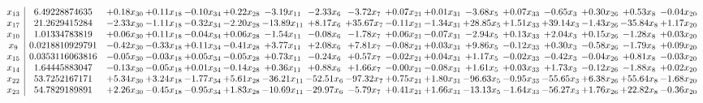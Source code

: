 \documentclass[9pt]{article}
\begin{document}
 \[\begin{array}{c| c c@{\hskip 2pt} c@{\hskip 2pt} c@{\hskip 2pt} c@{\hskip 2pt} c@{\hskip 2pt} c@{\hskip 2pt} c@{\hskip 2pt} c@{\hskip 2pt} c@{\hskip 2pt} c@{\hskip 2pt} c@{\hskip 2pt} c@{\hskip 2pt} c@{\hskip 2pt} c@{\hskip 2pt} c@{\hskip 2pt} }
 x_{13}   &  6.49228874635 & +  0.18 x_{30} & +  0.11 x_{18} & -0.10 x_{34} & +  0.22 x_{28} & -3.19 x_{11} & -2.33 x_{6} & -3.72 x_{7} & +  0.07 x_{21} & +  0.01 x_{31} & -3.68 x_{5} & +  0.07 x_{33} & -0.65 x_{3} & +  0.30 x_{26} & +  0.53 x_{8} & -0.04 x_{20}\\
 x_{17}   &  21.2629415284 & -2.33 x_{30} & -1.11 x_{18} & -0.32 x_{34} & -2.20 x_{28} & -13.89 x_{11} & +  8.17 x_{6} & + 35.67 x_{7} & -0.11 x_{21} & -1.34 x_{31} & + 28.85 x_{5} & +  1.51 x_{33} & + 39.14 x_{3} & -1.43 x_{26} & -35.84 x_{8} & +  1.17 x_{20}\\
 x_{10}   &  1.01334783819 & +  0.06 x_{30} & +  0.11 x_{18} & -0.04 x_{34} & +  0.06 x_{28} & -1.54 x_{11} & -0.08 x_{6} & -1.78 x_{7} & +  0.06 x_{21} & -0.07 x_{31} & -2.94 x_{5} & +  0.13 x_{33} & +  2.04 x_{3} & +  0.15 x_{26} & -1.28 x_{8} & +  0.03 x_{20}\\
 x_{9}   &  0.0218810929791 & -0.42 x_{30} & -0.33 x_{18} & +  0.11 x_{34} & -0.41 x_{28} & +  3.77 x_{11} & +  2.08 x_{6} & +  7.81 x_{7} & -0.08 x_{21} & +  0.03 x_{31} & +  9.86 x_{5} & -0.12 x_{33} & +  0.30 x_{3} & -0.58 x_{26} & -1.79 x_{8} & +  0.09 x_{20}\\
 x_{15}   &  0.0353116063816 & -0.05 x_{30} & -0.03 x_{18} & +  0.05 x_{34} & -0.05 x_{28} & +  0.73 x_{11} & -0.24 x_{6} & +  0.57 x_{7} & -0.02 x_{21} & +  0.04 x_{31} & +  1.17 x_{5} & -0.02 x_{33} & -0.42 x_{3} & -0.04 x_{26} & +  0.81 x_{8} & -0.03 x_{20}\\
 x_{14}   &  1.64445883047 & -0.13 x_{30} & -0.05 x_{18} & +  0.01 x_{34} & -0.14 x_{28} & +  0.36 x_{11} & +  0.88 x_{6} & +  1.66 x_{7} & -0.00 x_{21} & -0.08 x_{31} & +  1.61 x_{5} & +  0.03 x_{33} & +  1.73 x_{3} & -0.12 x_{26} & -1.88 x_{8} & +  0.02 x_{20}\\
 x_{22}   &  53.7252167171 & +  5.34 x_{30} & +  3.24 x_{18} & -1.77 x_{34} & +  5.61 x_{28} & -36.21 x_{11} & -52.51 x_{6} & -97.32 x_{7} & +  0.75 x_{21} & +  1.80 x_{31} & -96.63 x_{5} & -0.95 x_{33} & -55.65 x_{3} & +  6.38 x_{26} & + 55.64 x_{8} & -1.68 x_{20}\\
 x_{23}   &  54.7829189891 & +  2.26 x_{30} & -0.45 x_{18} & -0.95 x_{34} & +  1.83 x_{28} & -10.69 x_{11} & -29.97 x_{6} & -5.79 x_{7} & +  0.41 x_{21} & +  1.66 x_{31} & -13.13 x_{5} & -1.64 x_{33} & -56.27 x_{3} & +  1.76 x_{26} & + 22.82 x_{8} & -0.36 x_{20}\\

\end{array}\]
\end{document}
